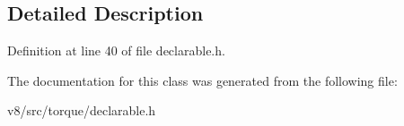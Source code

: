 \subsection{Detailed Description}


Definition at line 40 of file declarable.\+h.



The documentation for this class was generated from the following file\+:\begin{DoxyCompactItemize}
\item 
v8/src/torque/declarable.\+h\end{DoxyCompactItemize}
